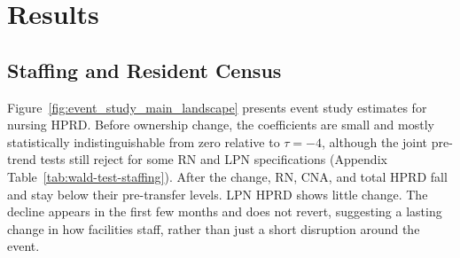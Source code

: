 \documentclass[12pt]{article}
\begin{document}
\section{Results} \label{sec:results}

\subsection{Staffing and Resident Census}

Figure~\ref{fig:event_study_main_landscape} presents event study estimates for nursing HPRD. Before ownership change, the coefficients are small and mostly statistically indistinguishable from zero relative to \(\tau=-4\), although the joint pre-trend tests still reject for some RN and LPN specifications (Appendix Table~\ref{tab:wald-test-staffing}). After the change, RN, CNA, and total HPRD fall and stay below their pre-transfer levels. LPN HPRD shows little change. The decline appears in the first few months and does not revert, suggesting a lasting change in how facilities staff, rather than just a short disruption around the event.

\end{document}
